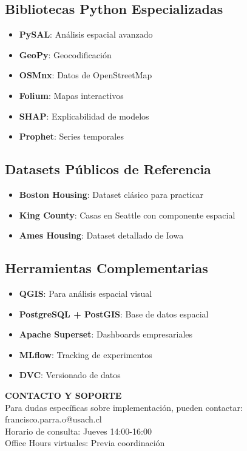 \documentclass[11pt,a4paper]{article}
\begin{document}
\subsection{Bibliotecas Python Especializadas}

\begin{itemize}
    \item \textbf{PySAL}: Análisis espacial avanzado
    \item \textbf{GeoPy}: Geocodificación
    \item \textbf{OSMnx}: Datos de OpenStreetMap
    \item \textbf{Folium}: Mapas interactivos
    \item \textbf{SHAP}: Explicabilidad de modelos
    \item \textbf{Prophet}: Series temporales
\end{itemize}

\subsection{Datasets Públicos de Referencia}

\begin{itemize}
    \item \textbf{Boston Housing}: Dataset clásico para practicar
    \item \textbf{King County}: Casas en Seattle con componente espacial
    \item \textbf{Ames Housing}: Dataset detallado de Iowa
\end{itemize}

\subsection{Herramientas Complementarias}

\begin{itemize}
    \item \textbf{QGIS}: Para análisis espacial visual
    \item \textbf{PostgreSQL + PostGIS}: Base de datos espacial
    \item \textbf{Apache Superset}: Dashboards empresariales
    \item \textbf{MLflow}: Tracking de experimentos
    \item \textbf{DVC}: Versionado de datos
\end{itemize}

\begin{tcolorbox}[colframe=usachblue,colback=blue!5]
\centering
\textbf{CONTACTO Y SOPORTE}\\[0.3cm]
Para dudas específicas sobre implementación, pueden contactar:\\
francisco.parra.o@usach.cl\\[0.2cm]
Horario de consulta: Jueves 14:00-16:00\\
Office Hours virtuales: Previa coordinación
\end{tcolorbox}
\end{document}
